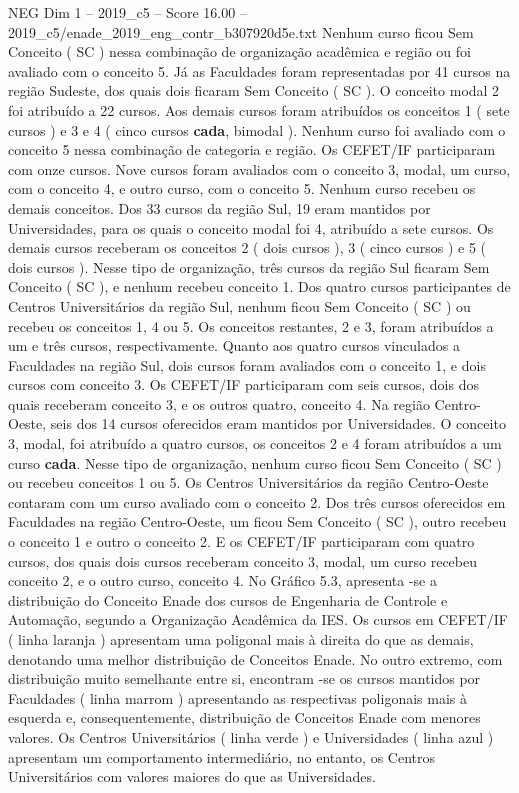 \begin{textsample}{NEG Dim 1 – 2019\_c5 – Score 16.00 – 2019\_c5/enade\_2019\_eng\_contr\_b307920d5e.txt}
Nenhum curso ficou Sem Conceito ( SC ) nessa combinação de organização acadêmica e região ou foi avaliado com o conceito 5.
Já as Faculdades foram representadas por 41 cursos na região Sudeste, dos quais dois ficaram Sem Conceito ( SC ).
O conceito modal 2 foi atribuído a 22 cursos.
Aos demais cursos foram atribuídos os conceitos 1 ( sete cursos ) e 3 e 4 ( cinco cursos \textbf{cada}, bimodal ).
Nenhum curso foi avaliado com o conceito 5 nessa combinação de categoria e região.
Os CEFET/IF participaram com onze cursos.
Nove cursos foram avaliados com o conceito 3, modal, um curso, com o conceito 4, e outro curso, com o conceito 5.
Nenhum curso recebeu os demais conceitos.
Dos 33 cursos da região Sul, 19 eram mantidos por Universidades, para os quais o conceito modal foi 4, atribuído a sete cursos.
Os demais cursos receberam os conceitos 2 ( dois cursos ), 3 ( cinco cursos ) e 5 ( dois cursos ).
Nesse tipo de organização, três cursos da região Sul ficaram Sem Conceito ( SC ), e nenhum recebeu conceito 1.
Dos quatro cursos participantes de Centros Universitários da região Sul, nenhum ficou Sem Conceito ( SC ) ou recebeu os conceitos 1, 4 ou 5.
Os conceitos restantes, 2 e 3, foram atribuídos a um e três cursos, respectivamente.
Quanto aos quatro cursos vinculados a Faculdades na região Sul, dois cursos foram avaliados com o conceito 1, e dois cursos com conceito 3.
Os CEFET/IF participaram com seis cursos, dois dos quais receberam conceito 3, e os outros quatro, conceito 4.
Na região Centro-Oeste, seis dos 14 cursos oferecidos eram mantidos por Universidades.
O conceito 3, modal, foi atribuído a quatro cursos, os conceitos 2 e 4 foram atribuídos a um curso \textbf{cada}.
Nesse tipo de organização, nenhum curso ficou Sem Conceito ( SC ) ou recebeu conceitos 1 ou 5.
Os Centros Universitários da região Centro-Oeste contaram com um curso avaliado com o conceito 2.
Dos três cursos oferecidos em Faculdades na região Centro-Oeste, um ficou Sem Conceito ( SC ), outro recebeu o conceito 1 e outro o conceito 2.
E os CEFET/IF participaram com quatro cursos, dos quais dois cursos receberam conceito 3, modal, um curso recebeu conceito 2, e o outro curso, conceito 4.
No Gráfico 5.3, apresenta -se a distribuição do Conceito Enade dos cursos de Engenharia de Controle e Automação, segundo a Organização Acadêmica da IES.
Os cursos em CEFET/IF ( linha laranja ) apresentam uma poligonal mais à direita do que as demais, denotando uma melhor distribuição de Conceitos Enade.
No outro extremo, com distribuição muito semelhante entre si, encontram -se os cursos mantidos por Faculdades ( linha marrom ) apresentando as respectivas poligonais mais à esquerda e, consequentemente, distribuição de Conceitos Enade com menores valores.
Os Centros Universitários ( linha verde ) e Universidades ( linha azul ) apresentam um comportamento intermediário, no entanto, os Centros Universitários com valores maiores do que as Universidades.

\end{textsample}
